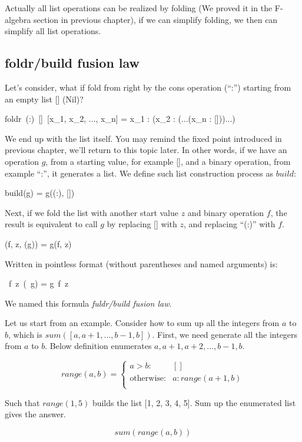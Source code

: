 \documentclass{article}
\begin{document}
Actually all list operations can be realized by folding (We proved it in the F-algebra section in previous chapter), if we can simplify folding, we then can simplify all list operations.

\subsection{foldr/build fusion law}
Let's consider, what if fold from right by the cons operation (``:'') starting from an empty list [] (Nil)?

\be
foldr\ (:)\ []\ [x_1, x_2, ..., x_n] = x_1 : (x_2 : (...(x_n : []))...)
\label{eq:foldr-fixed-point}
\ee

We end up with the list itself. You may remind the fixed point introduced in previous chapter, we'll return to this topic later. In other words, if we have an operation $g$, from a starting value, for example [], and a binary operation, from example ``:'', it generates a list. We define such list construction process as $build$:

\be
build(g) = g((:), [])
\label{eq:build-definition}
\ee

Next, if we fold the list with another start value $z$ and binary operation $f$, the result is equivalent to call $g$ by replacing [] with $z$, and replacing ``(:)'' with $f$.

\be
{}(f, z, (g)) = g(f, z)
\ee

Written in pointless format (without parentheses and named arguments) is:

\be
{}\ f\ z\ (\ g) = g\ f\ z
\label{eq:foldr-build-fusion-law}
\ee

We named this formula {\em fuldr/build fusion law}.

Let us start from an example. Consider how to sum up all the integers from $a$ to $b$, which is $sum([a, a+1, ..., b-1, b])$. First, we need generate all the integers from $a$ to $b$. Below definition enumerates $a, a+1, a+2, ..., b-1, b$.

\[
range(a, b) =
\begin{cases}
a > b: & [] \\
\text{otherwise}: & a : range(a+1, b) \\
\end{cases}
\]

Such that $range(1, 5)$ builds the list [1, 2, 3, 4, 5]. Sum up the enumerated list gives the answer.

\[
sum(range(a, b))
\]
\end{document}
